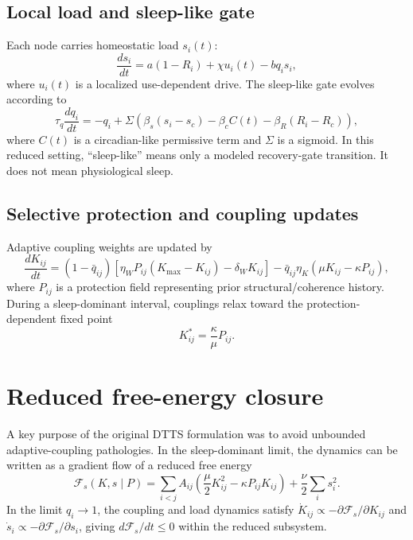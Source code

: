 \documentclass[11pt,a4paper]{article}
\begin{document}
\subsection{Local load and sleep-like gate}
Each node carries homeostatic load $s_i(t)$:
\begin{equation}
\frac{ds_i}{dt}=a(1-R_i)+\chi u_i(t)-bq_i s_i,
\end{equation}
where $u_i(t)$ is a localized use-dependent drive. The sleep-like gate evolves according to
\begin{equation}
\tau_q\frac{dq_i}{dt}=-q_i+\Sigma\left(\beta_s(s_i-s_c)-\beta_c C(t)-\beta_R(R_i-R_c)\right),
\end{equation}
where $C(t)$ is a circadian-like permissive term and $\Sigma$ is a sigmoid. In this reduced setting, ``sleep-like'' means only a modeled recovery-gate transition. It does not mean physiological sleep.

\subsection{Selective protection and coupling updates}
Adaptive coupling weights are updated by
\begin{equation}
\frac{dK_{ij}}{dt}=(1-\bar q_{ij})\left[\eta_W P_{ij}(K_{\max}-K_{ij})-\delta_W K_{ij}\right]-\bar q_{ij}\eta_K(\mu K_{ij}-\kappa P_{ij}),
\end{equation}
where $P_{ij}$ is a protection field representing prior structural/coherence history. During a sleep-dominant interval, couplings relax toward the protection-dependent fixed point
\begin{equation}
K^*_{ij}=\frac{\kappa}{\mu}P_{ij}.
\end{equation}

\section{Reduced free-energy closure}
A key purpose of the original DTTS formulation was to avoid unbounded adaptive-coupling pathologies. In the sleep-dominant limit, the dynamics can be written as a gradient flow of a reduced free energy
\begin{equation}
\mathcal{F}_s(K,s\mid P)=\sum_{i<j}A_{ij}\left(\frac{\mu}{2}K_{ij}^2-\kappa P_{ij}K_{ij}\right)+\frac{\nu}{2}\sum_i s_i^2.
\end{equation}
In the limit $q_i\to1$, the coupling and load dynamics satisfy $\dot K_{ij}\propto-\partial\mathcal{F}_s/\partial K_{ij}$ and $\dot s_i\propto-\partial\mathcal{F}_s/\partial s_i$, giving $d\mathcal{F}_s/dt\le0$ within the reduced subsystem.
\end{document}
